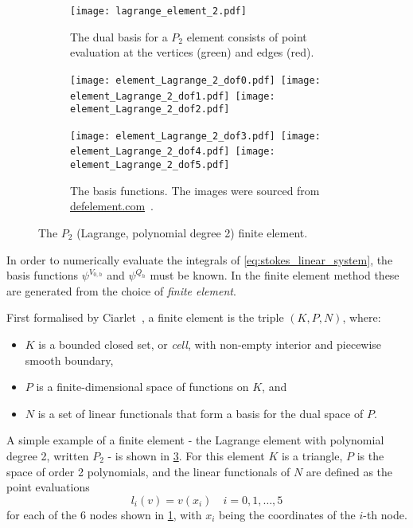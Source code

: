 \documentclass[thesis]{subfiles}
\begin{document}
\begin{figure}
  \centering
  \begin{subfigure}[b]{.4\textwidth}
    \centering
    \texttt{[image: lagrange\_element\_2.pdf]}
    \caption{
      The dual basis for a $P_2$ element consists of point evaluation at the vertices (green) and edges (red).
    }
    \label{fig:lagrange_element_2_dofs}
  \end{subfigure}
  \begin{subfigure}[b]{.58\textwidth}
    \centering
    \texttt{[image: element\_Lagrange\_2\_dof0.pdf]}\,%
    \texttt{[image: element\_Lagrange\_2\_dof1.pdf]}\,%
    \texttt{[image: element\_Lagrange\_2\_dof2.pdf]}

    \texttt{[image: element\_Lagrange\_2\_dof3.pdf]}\,%
    \texttt{[image: element\_Lagrange\_2\_dof4.pdf]}\,%
    \texttt{[image: element\_Lagrange\_2\_dof5.pdf]}
    \caption{
      The basis functions.
      The images were sourced from \href{https://defelement.com}{defelement.com}~\cite{defelement}.
    }
    \label{fig:lagrange_element_2_basis}
  \end{subfigure}

  \caption{The $P_2$ (Lagrange, polynomial degree 2) finite element.}
  \label{fig:lagrange_element_2}
\end{figure}

In order to numerically evaluate the integrals of \cref{eq:stokes_linear_system}, the basis functions $\psi^{V_{0,h}}$ and $\psi^{Q_h}$ must be known.
In the finite element method these are generated from the choice of \emph{finite element}.

First formalised by Ciarlet~\parencite{ciarletElement2002}, a finite element is the triple $(K, P, N)$, where:
\begin{itemize}
  \item $K$ is a bounded closed set, or \emph{cell}, with non-empty interior and piecewise smooth boundary,
  \item $P$ is a finite-dimensional space of functions on $K$, and
  \item $N$ is a set of linear functionals that form a basis for the dual space of $P$.
\end{itemize}

A simple example of a finite element - the Lagrange element with polynomial degree 2, written $P_2$ - is shown in \cref{fig:lagrange_element_2}.
For this element $K$ is a triangle, $P$ is the space of order 2 polynomials, and the linear functionals of $N$ are defined as the point evaluations
\begin{equation*}
  l_i(v) = v(x_i)
  \quad
  i = 0,1,\dots,5
\end{equation*}
for each of the 6 nodes shown in \cref{fig:lagrange_element_2_dofs}, with $x_i$ being the coordinates of the $i$-th node.
\end{document}
